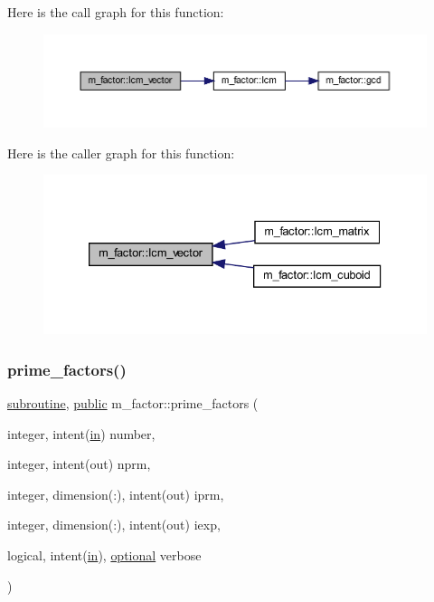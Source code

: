 Here is the call graph for this function\+:
\nopagebreak
\begin{figure}[H]
\begin{center}
\leavevmode
\includegraphics[width=350pt]{namespacem__factor_a3802e87d5a394888aefc2d6cf496509f_cgraph}
\end{center}
\end{figure}
Here is the caller graph for this function\+:
\nopagebreak
\begin{figure}[H]
\begin{center}
\leavevmode
\includegraphics[width=333pt]{namespacem__factor_a3802e87d5a394888aefc2d6cf496509f_icgraph}
\end{center}
\end{figure}
\mbox{\label{namespacem__factor_a6440013d17b820fa65096b34f21d367d}} 
\subsubsection{\texorpdfstring{prime\+\_\+factors()}{prime\_factors()}}
{\footnotesize\ttfamily \hyperlink{M__stopwatch_83_8txt_acfbcff50169d691ff02d4a123ed70482}{subroutine}, \hyperlink{M__stopwatch_83_8txt_a2f74811300c361e53b430611a7d1769f}{public} m\+\_\+factor\+::prime\+\_\+factors (\begin{DoxyParamCaption}\item[{integer, intent(\hyperlink{M__journal_83_8txt_afce72651d1eed785a2132bee863b2f38}{in})}]{number,  }\item[{integer, intent(out)}]{nprm,  }\item[{integer, dimension(\+:), intent(out)}]{iprm,  }\item[{integer, dimension(\+:), intent(out)}]{iexp,  }\item[{logical, intent(\hyperlink{M__journal_83_8txt_afce72651d1eed785a2132bee863b2f38}{in}), \hyperlink{option__stopwatch_83_8txt_aa4ece75e7acf58a4843f70fe18c3ade5}{optional}}]{verbose }\end{DoxyParamCaption})}



